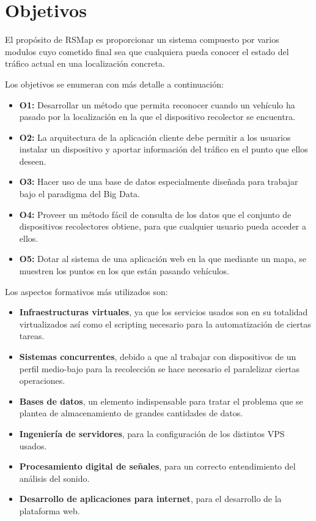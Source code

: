 \chapter{Objetivos}
\label{chap2}


El propósito de RSMap es proporcionar un sistema compuesto por varios modulos cuyo cometido final sea que cualquiera pueda conocer el estado del tráfico actual en una localización concreta.

\bigskip
Los objetivos se enumeran con más detalle a continuación:

\begin{itemize}
  \item \textbf{O1:} Desarrollar un método que permita reconocer cuando un vehículo ha pasado por la localización en la que el dispositivo recolector se encuentra.
  \item \textbf{O2:} La arquitectura de la aplicación cliente debe permitir a los usuarios instalar un dispositivo y aportar información del tráfico en el punto que ellos deseen.
  \item \textbf{O3:} Hacer uso de una base de datos especialmente diseñada para trabajar bajo el paradigma del Big Data.
  \item \textbf{O4:} Proveer un método fácil de consulta de los datos que el conjunto de dispositivos recolectores obtiene, para que cualquier usuario pueda acceder a ellos.
  \item \textbf{O5:} Dotar al sistema de una aplicación web en la que mediante un mapa, se muestren los puntos en los que están pasando vehículos.
\end{itemize}

\newpage

Los aspectos formativos más utilizados son:
\begin{itemize}
  \item \textbf{Infraestructuras virtuales}, ya que los servicios usados son en su totalidad virtualizados así como el scripting necesario para la automatización de ciertas tareas.

  \item \textbf{Sistemas concurrentes}, debido a que al trabajar con dispositivos de un perfil medio-bajo para la recolección se hace necesario el paralelizar ciertas operaciones.
  \item \textbf{Bases de datos}, un elemento indispensable para tratar el problema que se plantea de almacenamiento de grandes cantidades de datos.
  \item \textbf{Ingeniería de servidores}, para la configuración de los distintos VPS usados.
  \item \textbf{Procesamiento digital de señales}, para un correcto entendimiento del análisis del sonido.
  \item \textbf{Desarrollo de aplicaciones para internet}, para el desarrollo de la plataforma web.
\end{itemize}

